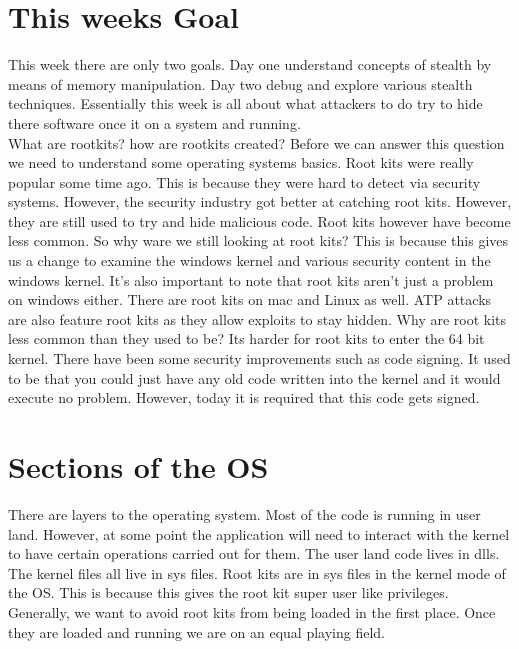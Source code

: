\documentclass[letterpaper, onecolumn,10pt]{IEEEtran}
\begin{document}
		    \section{This weeks Goal}
		    This week there are only two goals. Day one understand concepts of stealth by means of memory manipulation. Day two debug and explore various stealth techniques. Essentially this week is all about what attackers to do try to hide there software once it on a system and running.\\
		    
		    What are rootkits? how are rootkits created? Before we can answer this question we need to understand some operating systems basics. Root kits were really popular some time ago. This is because they were hard to detect via security systems. However, the security industry got better at catching root kits. However, they are still used to try and hide malicious code. Root kits however have become less common. So why ware we still looking at root kits? This is because this gives us a change to examine the windows kernel and various security content in the windows kernel. It's also important to note that root kits aren't just a problem on windows either. There are root kits on mac and Linux as well. ATP attacks are also feature root kits as they allow exploits to stay hidden. Why are root kits less common than they used to be? Its harder for root kits to enter the 64 bit kernel. There have been some security improvements such as code signing. It used to be that you could just have any old code written into the kernel and it would execute no problem. However, today it is required that this code gets signed.\\
		    
		    \section{Sections of the OS}
		    There are layers to the operating system. Most of the code is running in user land. However, at some point the application will need to interact with the kernel to have certain operations carried out for them. The user land code lives in dlls. The kernel files all live in sys files. Root kits are in sys files in the kernel mode of the OS. This is because this gives the root kit super user like privileges. Generally, we want to avoid root kits from being loaded in the first place. Once they are loaded and running we are on an equal playing field.\\
		    
\end{document}
